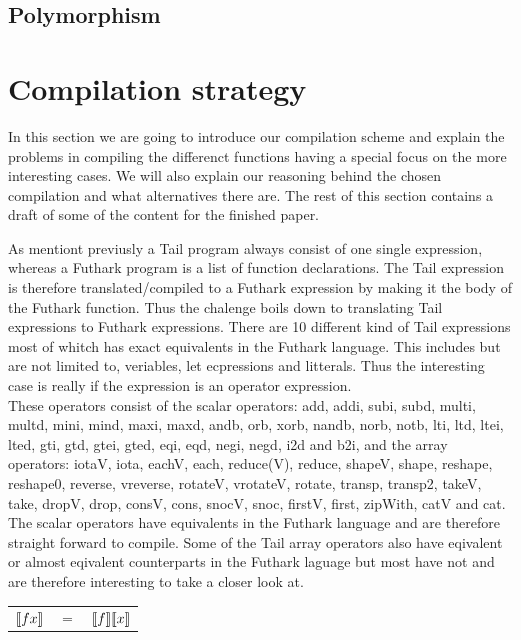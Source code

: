 \documentclass[11pt]{article}
\begin{document}
\subsection{Polymorphism}

\section{Compilation strategy}
In this section we are going to introduce our compilation scheme and explain the problems in compiling the differenct functions having a special focus on the more interesting cases. We will also explain our reasoning behind the chosen compilation and what alternatives there are. The rest of this section contains a draft of some of the content for the finished paper. 

As mentiont previusly a Tail program always consist of one single expression, whereas a Futhark program is a list of function declarations. The Tail expression is therefore translated/compiled to a Futhark expression by making it the body of the Futhark function. 
Thus the chalenge boils down to translating Tail expressions to Futhark expressions. 
There are 10 different kind of Tail expressions most of whitch has exact equivalents in the Futhark language. This includes but are not limited to, veriables, let ecpressions and litterals. Thus the interesting case is really if the expression is an operator expression. \\

These operators consist of the scalar operators: add, addi, subi, subd, multi, multd, mini, mind, maxi, maxd, andb, orb, xorb, nandb, norb, notb, lti, ltd, ltei, lted, gti, gtd, gtei, gted, eqi, eqd, negi, negd, i2d and b2i, and the array operators: iotaV, iota, eachV, each, reduce(V), reduce, shapeV, shape, reshape, reshape0, reverse, vreverse, rotateV, vrotateV, rotate, transp, transp2, takeV, take, dropV, drop, consV, cons, snocV, snoc, firstV, first, zipWith, catV and cat. \\

The scalar operators have equivalents in the Futhark language and are therefore straight forward to compile. Some of the Tail array operators also have eqivalent or almost eqivalent counterparts in the Futhark laguage but most have not and are therefore interesting to take a closer look at.


\begin{tabular}{l c l}
$\llbracket f x \rrbracket$ & $=$ & $\llbracket f \rrbracket \llbracket x \rrbracket$
\end{tabular}
\end{document}
